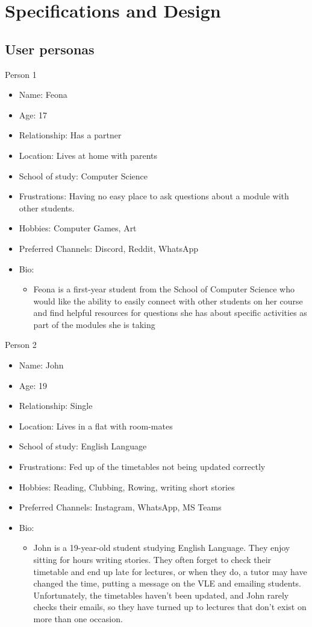 \chapter{Specifications and Design}

\section{User personas}

Person 1
\begin{itemize}
    \item Name: Feona
    \item Age: 17
    \item Relationship: Has a partner
    \item Location: Lives at home with parents
    \item School of study: Computer Science
    \item Frustrations: Having no easy place to ask questions about a module with other students.
    \item Hobbies: Computer Games, Art
    \item Preferred Channels: Discord, Reddit, WhatsApp
    \item Bio:
    \begin{itemize}
        \item Feona is a first-year student from the School of Computer Science who would like the ability to easily connect with other students on her course and find helpful resources for questions she has about specific activities as part of the modules she is taking
    \end{itemize}
\end{itemize}

Person 2
\begin{itemize}
    \item Name: John
    \item Age: 19
    \item Relationship: Single
    \item Location: Lives in a flat with room-mates
    \item School of study: English Language
    \item Frustrations: Fed up of the timetables not being updated correctly
    \item Hobbies: Reading, Clubbing, Rowing, writing short stories
    \item Preferred Channels: Instagram, WhatsApp, MS Teams
    \item Bio:
    \begin{itemize}
        \item John is a 19-year-old student studying English Language. They enjoy sitting for hours writing stories. They often forget to check their timetable and end up late for lectures, or when they do, a tutor may have changed the time, putting a message on the VLE and emailing students. Unfortunately, the timetables haven't been updated, and John rarely checks their emails, so they have turned up to lectures that don't exist on more than one occasion.
    \end{itemize}
\end{itemize}

